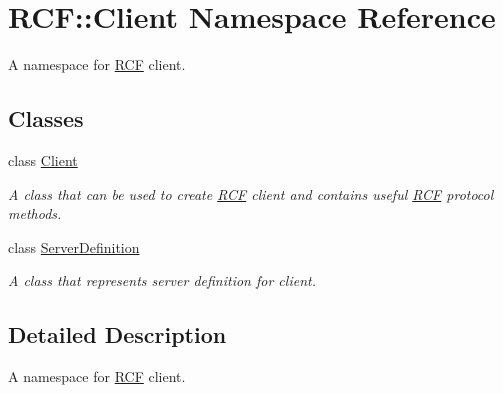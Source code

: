 \hypertarget{namespace_r_c_f_1_1_client}{}\section{R\+C\+F\+:\+:Client Namespace Reference}
\label{namespace_r_c_f_1_1_client}


A namespace for \hyperlink{namespace_r_c_f}{R\+C\+F} client.  


\subsection*{Classes}
\begin{DoxyCompactItemize}
\item 
class \hyperlink{class_r_c_f_1_1_client_1_1_client}{Client}
\begin{DoxyCompactList}\small\item\em A class that can be used to create \hyperlink{namespace_r_c_f}{R\+C\+F} client and contains useful \hyperlink{namespace_r_c_f}{R\+C\+F} protocol methods. \end{DoxyCompactList}\item 
class \hyperlink{class_r_c_f_1_1_client_1_1_server_definition}{Server\+Definition}
\begin{DoxyCompactList}\small\item\em A class that represents server definition for client. \end{DoxyCompactList}\end{DoxyCompactItemize}


\subsection{Detailed Description}
A namespace for \hyperlink{namespace_r_c_f}{R\+C\+F} client. 
